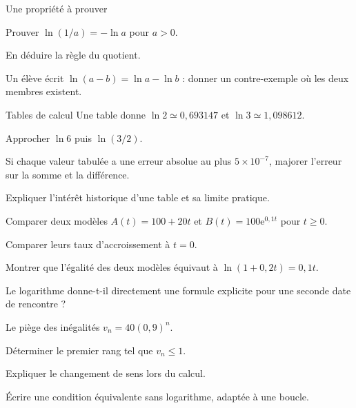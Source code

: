 \begingroup\renewcommand{\otBesoinPlace}[1]{}\begin{minipage}{\linewidth}
\begin{exercice}[3]{Une propriété à prouver}

\begin{questions}
\item Prouver $\ln(1/a)=-\ln a$ pour $a>0$.
\item En déduire la règle du quotient.
\item Un élève écrit $\ln(a-b)=\ln a-\ln b$ : donner un contre-exemple où les deux membres existent.
\end{questions}
\end{exercice}
\begin{exercice}[3]{Tables de calcul}
Une table donne $\ln2\simeq0{,}693147$ et $\ln3\simeq1{,}098612$.
\begin{questions}
\item Approcher $\ln6$ puis $\ln(3/2)$.
\item Si chaque valeur tabulée a une erreur absolue au plus $5\times10^{-7}$, majorer l’erreur sur la somme et la différence.
\item Expliquer l’intérêt historique d’une table et sa limite pratique.
\end{questions}
\end{exercice}
\begin{exercice}[3]{Comparer deux modèles}
$A(t)=100+20t$ et $B(t)=100\mathrm e^{0{,}1t}$ pour $t\geq0$.
\begin{questions}
\item Comparer leurs taux d’accroissement à $t=0$.
\item Montrer que l’égalité des deux modèles équivaut à $\ln(1+0{,}2t)=0{,}1t$.
\item Le logarithme donne-t-il directement une formule explicite pour une seconde date de rencontre ?
\end{questions}
\end{exercice}
\begin{exercice}[3]{Le piège des inégalités}
$v_n=40(0{,}9)^n$.
\begin{questions}
\item Déterminer le premier rang tel que $v_n\leq1$.
\item Expliquer le changement de sens lors du calcul.
\item Écrire une condition équivalente sans logarithme, adaptée à une boucle.
\end{questions}
\end{exercice}
\end{minipage}\endgroup
